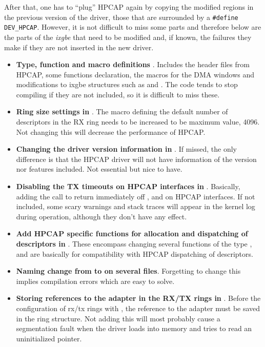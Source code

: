 \documentclass[oneside]{hpman}
\begin{document}
After that, one has to ``plug'' HPCAP again by copying the modified regions in the previous version of the driver, those that are surrounded by a \texttt{\#define DEV\_HPCAP}. However, it is not difficult to miss some parts and therefore below are the parts of the \textit{ixgbe} that need to be modified and, if known, the failures they make if they are not inserted in the new driver.

\begin{itemize}
	\item \textbf{Type, function and macro definitions }. Includes the header files from HPCAP, some functions declaration, the macros for the DMA windows and modifications to ixgbe structures such as  and . The code tends to stop compiling if they are not included, so it is difficult to miss these.
	\item \textbf{Ring size settings in }. The  macro defining the default number of descriptors in the RX ring needs to be increased to be maximum value, 4096. Not changing this will decrease the performance of HPCAP.
	\item \textbf{Changing the driver version information in }. If missed, the only difference is that the HPCAP driver will not have information of the version nor features included. Not essential but nice to have.
	\item \textbf{Disabling the TX timeouts on HPCAP interfaces in }. Basically, adding the call to return immediately off ,  and  on HPCAP interfaces. If not included, some scary warnings and stack traces will appear in the kernel log during operation, although they don't have any effect.
	\item \textbf{Add HPCAP specific functions for allocation and dispatching of descriptors in }. These encompass changing several functions of the type , and are basically for compatibility with HPCAP dispatching of descriptors.
	\item \textbf{Naming change from  to  on several files}. Forgetting to change this implies compilation errors which are easy to solve.
	\item \textbf{Storing references to the adapter in the RX/TX rings in }. Before the configuration of rx/tx rings with , the reference to the adapter must be saved in the ring structure. Not adding this will most probably cause a segmentation fault when the driver loads into memory and tries to read an uninitialized pointer.

\end{itemize}
\end{document}
